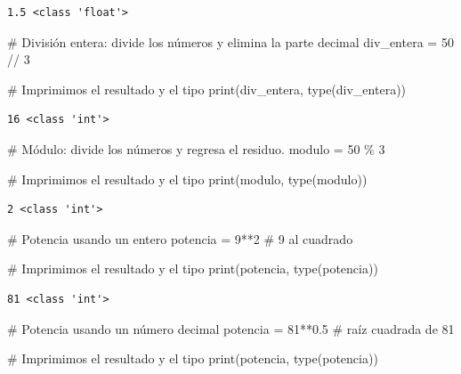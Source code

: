 \documentclass[
  spanish,
  letterpaper,
]{scrbook}
\newenvironment{Shaded}{\begin{snugshade}}{\end{snugshade}}
\newcommand{\BuiltInTok}[1]{\textcolor[rgb]{0.00,0.23,0.31}{#1}}
\newcommand{\CommentTok}[1]{\textcolor[rgb]{0.37,0.37,0.37}{#1}}
\newcommand{\DecValTok}[1]{\textcolor[rgb]{0.68,0.00,0.00}{#1}}
\newcommand{\FloatTok}[1]{\textcolor[rgb]{0.68,0.00,0.00}{#1}}
\newcommand{\NormalTok}[1]{\textcolor[rgb]{0.00,0.23,0.31}{#1}}
\newcommand{\OperatorTok}[1]{\textcolor[rgb]{0.37,0.37,0.37}{#1}}
\theoremstyle{definition}
\theoremstyle{remark}
\begin{document}
\begin{verbatim}
1.5 <class 'float'>
\end{verbatim}

\begin{Shaded}
\begin{Highlighting}[]
\CommentTok{\# División entera: divide los números y elimina la parte decimal}
\NormalTok{div\_entera }\OperatorTok{=} \DecValTok{50} \OperatorTok{//} \DecValTok{3}

\CommentTok{\# Imprimimos el resultado y el tipo}
\BuiltInTok{print}\NormalTok{(div\_entera, }\BuiltInTok{type}\NormalTok{(div\_entera))}
\end{Highlighting}
\end{Shaded}

\begin{verbatim}
16 <class 'int'>
\end{verbatim}

\begin{Shaded}
\begin{Highlighting}[]
\CommentTok{\# Módulo: divide los números y regresa el residuo.}
\NormalTok{modulo }\OperatorTok{=} \DecValTok{50} \OperatorTok{\%} \DecValTok{3}

\CommentTok{\# Imprimimos el resultado y el tipo}
\BuiltInTok{print}\NormalTok{(modulo, }\BuiltInTok{type}\NormalTok{(modulo))}
\end{Highlighting}
\end{Shaded}

\begin{verbatim}
2 <class 'int'>
\end{verbatim}

\begin{Shaded}
\begin{Highlighting}[]
\CommentTok{\# Potencia usando un entero}
\NormalTok{potencia }\OperatorTok{=} \DecValTok{9}\OperatorTok{**}\DecValTok{2} \CommentTok{\# 9 al cuadrado}

\CommentTok{\# Imprimimos el resultado y el tipo}
\BuiltInTok{print}\NormalTok{(potencia, }\BuiltInTok{type}\NormalTok{(potencia))}
\end{Highlighting}
\end{Shaded}

\begin{verbatim}
81 <class 'int'>
\end{verbatim}

\begin{Shaded}
\begin{Highlighting}[]
\CommentTok{\# Potencia usando un número decimal}
\NormalTok{potencia }\OperatorTok{=} \DecValTok{81}\OperatorTok{**}\FloatTok{0.5} \CommentTok{\# raíz cuadrada de 81}

\CommentTok{\# Imprimimos el resultado y el tipo}
\BuiltInTok{print}\NormalTok{(potencia, }\BuiltInTok{type}\NormalTok{(potencia))}
\end{Highlighting}
\end{Shaded}
\end{document}
